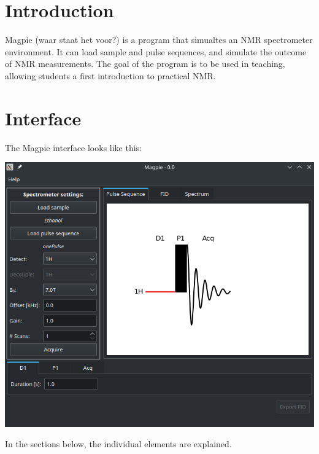 \documentclass[11pt,a4paper]{article}
\renewcommand\cfttoctitlefont{\color{black!70}\Huge\fontfamily{SourceSansPro-LF}\bfseries}
\begin{document}


\thispagestyle{empty}
\newpage
\mbox{}


\renewcommand\cfttoctitlefont{\color{black}\Huge\fontfamily{SourceSansPro-LF}\bfseries}
\setcounter{tocdepth}{2}
\tableofcontents %

\renewcommand\cfttoctitlefont{\color{black!70}\Huge\fontfamily{SourceSansPro-LF}\bfseries}


\section{Introduction}
Magpie (waar staat het voor?) is a program that simualtes an NMR spectrometer environment. It can load sample and pulse sequences, and simulate the outcome of NMR measurements. The goal of the program is to be used in teaching, allowing students a first introduction to practical NMR.

\section{Interface}

The Magpie interface looks like this:
\begin{center}
\includegraphics[width=0.7\linewidth]{images/Full_interface.png}
\end{center}
In the sections below, the individual elements are explained.
\end{document}
